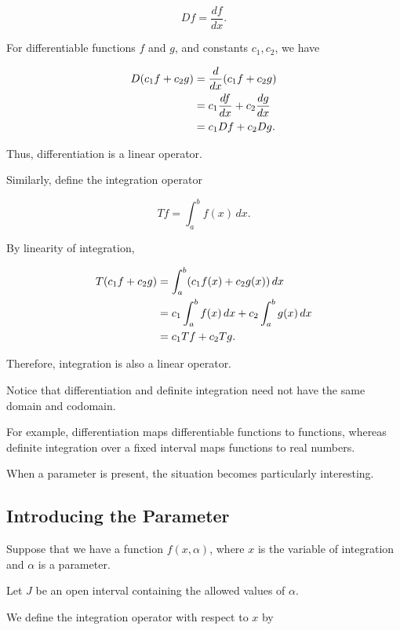 \documentclass[11pt,a4paper]{article}
\theoremstyle{definition}
\theoremstyle{remark}
\begin{document}
\[
    Df=\frac{df}{dx}.
\]

For differentiable functions
$f$ and $g$, and constants
$c_1,c_2$, we have

\begin{align}
    D(c_1f+c_2g)
    &=
    \frac{d}{dx}(c_1f+c_2g)
    \notag\\
    &=
    c_1\frac{df}{dx}
    +
    c_2\frac{dg}{dx}
    \notag\\
    &=
    c_1Df+c_2Dg.
\end{align}

Thus, differentiation is
a linear operator.

Similarly, define the
integration operator

\begin{equation}
    Tf=\int_a^b f(x)\,dx.
\end{equation}

By linearity of integration,

\begin{align}
    T(c_1f+c_2g)
    &=
    \int_a^b
    (c_1f(x)+c_2g(x))\,dx
    \notag\\
    &=
    c_1\int_a^b f(x)\,dx
    +
    c_2\int_a^b g(x)\,dx
    \notag\\
    &=
    c_1Tf+c_2Tg.
\end{align}

Therefore, integration is
also a linear operator.

Notice that differentiation
and definite integration
need not have the same
domain and codomain.

For example, differentiation
maps differentiable functions
to functions, whereas
definite integration over
a fixed interval maps
functions to real numbers.

When a parameter is present,
the situation becomes
particularly interesting.

\subsection{Introducing the Parameter}

Suppose that we have a
function $f(x,\alpha)$,
where $x$ is the variable
of integration and
$\alpha$ is a parameter.

Let $J$ be an open interval
containing the allowed
values of $\alpha$.

We define the integration
operator with respect to
$x$ by
\end{document}
